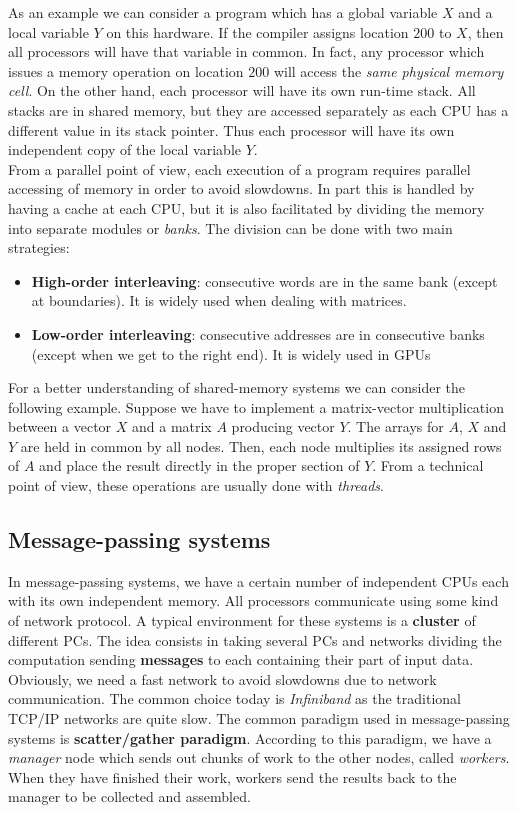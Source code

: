 As an example we can consider a program which has a global variable $X$ and a local variable $Y$ on this hardware. If the compiler assigns location $200$ to $X$, then all processors will have that variable in common. In fact, any processor which issues a memory operation on location $200$ will access the \textit{same physical memory cell}. On the other hand, each processor will have its own run-time stack. All stacks are in shared memory, but they are accessed separately as each CPU has a different value in its stack pointer. Thus each processor will have its own independent copy of the local variable $Y$.\\

From a parallel point of view, each execution of a program requires parallel accessing of memory in order to avoid slowdowns. In part this is handled by having a cache at each CPU, but it is also facilitated by dividing the memory into separate modules or \textit{banks}. The division can be done with two main strategies:
\begin{itemize}
 \item \textbf{High-order interleaving}: consecutive words are in the same bank (except at boundaries). It is widely used when dealing with matrices.
 \item \textbf{Low-order interleaving}: consecutive addresses are in consecutive banks (except when we get to the right end). It is widely used in GPUs
\end{itemize}

For a better understanding of shared-memory systems we can consider the following example. Suppose we have to implement a matrix-vector multiplication between a vector $X$ and a matrix $A$ producing vector $Y$. The arrays for $A$, $X$ and $Y$ are held in common by all nodes. Then, each node multiplies its assigned rows of $A$ and place the result directly in the proper section of $Y$. From a technical point of view, these operations are usually done with \textit{threads}.

\subsection{Message-passing systems}

In message-passing systems, we have a certain number of independent CPUs each with its own independent memory. All processors communicate using some kind of network protocol. A typical environment for these systems is a \textbf{cluster} of different PCs. The idea consists in taking several PCs and networks dividing the computation sending \textbf{messages} to each containing their part of input data. Obviously, we need a fast network to avoid slowdowns due to network communication. The common choice today is \textit{Infiniband} as the traditional TCP/IP networks are quite slow. The common paradigm used in message-passing systems is \textbf{scatter/gather paradigm}. According to this paradigm, we have a \textit{manager} node which sends out chunks of work to the other nodes, called \textit{workers}. When they have finished their work, workers send the results back to the manager to be collected and assembled.\\

